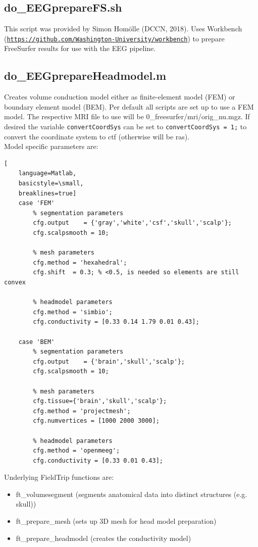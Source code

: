 \documentclass[12pt,a4paper]{scrartcl}
\begin{document}
\subsection{do\_EEGprepareFS.sh}
\label{sh:prepFS4EEG}
This script was provided by Simon Hom\"olle (DCCN, 2018). Uses Workbench (\href{https://github.com/Washington-University/workbench}{\nolinkurl{https://github.com/Washington-University/workbench}}) to prepare FreeSurfer results for use with the EEG pipeline.\\

\subsection{do\_EEGprepareHeadmodel.m}
\label{m:prepHM}
Creates volume conduction model either as finite-element model (FEM) or boundary element model (BEM). Per default all scripts are set up to use a FEM model. The respective MRI file to use will be 0\_freesurfer/mri/orig\_nu.mgz. If desired the variable \texttt{convertCoordSys} can be set to \texttt{convertCoordSys = 1;} to convert the coordinate system to ctf (otherwise will be ras).\\

Model specific parameters are:
\begin{lstlisting}[
    language=Matlab,
    basicstyle=\small,
    breaklines=true]
    case 'FEM'
        % segmentation parameters
        cfg.output    = {'gray','white','csf','skull','scalp'};
        cfg.scalpsmooth = 10;

        % mesh parameters
        cfg.method = 'hexahedral';
        cfg.shift  = 0.3; % <0.5, is needed so elements are still convex

        % headmodel parameters
        cfg.method = 'simbio';
        cfg.conductivity = [0.33 0.14 1.79 0.01 0.43];

    case 'BEM'
        % segmentation parameters
        cfg.output    = {'brain','skull','scalp'};
        cfg.scalpsmooth = 10;

        % mesh parameters
        cfg.tissue={'brain','skull','scalp'};
        cfg.method = 'projectmesh';
        cfg.numvertices = [1000 2000 3000];

        % headmodel parameters
        cfg.method = 'openmeeg';
        cfg.conductivity = [0.33 0.01 0.43];
\end{lstlisting}

Underlying FieldTrip functions are:
\begin{itemize}
\item ft\_volumesegment (segments anatomical data into distinct structures (e.g. skull))
\item ft\_prepare\_mesh (sets up 3D mesh for head model preparation)
\item ft\_prepare\_headmodel (creates the conductivity model)
\end{itemize}
\end{document}
